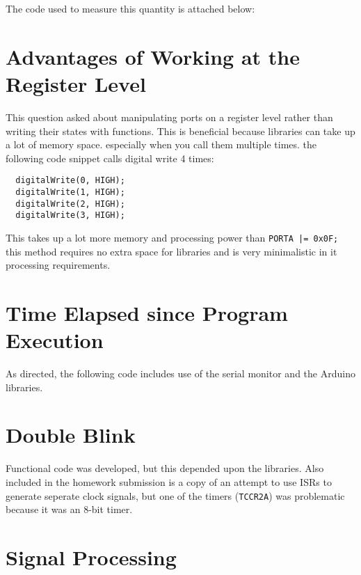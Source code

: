 \documentclass{hw}
\begin{document}
The code used to measure this quantity is attached below:



\section{Advantages of Working at the Register Level}
This question asked about manipulating ports on a register level
rather than writing their states with functions. This is beneficial
because libraries can take up a lot of memory space. especially when
you call them multiple times. the following code snippet calls digital write
4 times:
\begin{lstlisting}
  digitalWrite(0, HIGH);
  digitalWrite(1, HIGH);
  digitalWrite(2, HIGH);
  digitalWrite(3, HIGH);
\end{lstlisting}

This takes up a lot more memory and processing power than \texttt{PORTA |=
0x0F;} this method requires no extra space for libraries and is
very minimalistic in it processing requirements.

\section{Time Elapsed since Program Execution}

As directed, the following code includes use of the serial monitor
and the Arduino libraries.



\section{Double Blink}

Functional code was developed, but this depended upon the libraries.
Also included in the homework submission is a copy of an attempt to
use ISRs to generate seperate clock signals, but one of the timers
(\texttt{TCCR2A}) was problematic because it was an 8-bit timer.


\section{Signal Processing}
\end{document}

